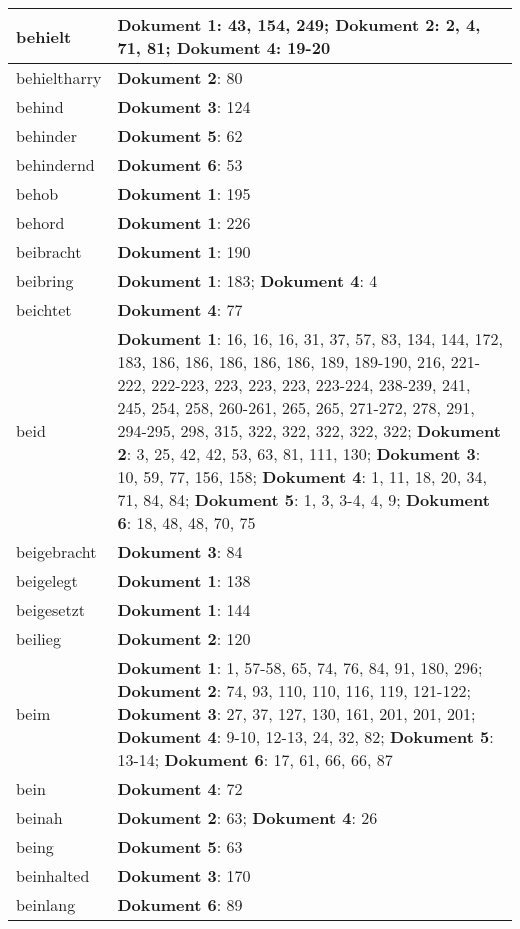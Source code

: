 \documentclass[a5paper]{article}
\begin{document}
\begin{longtable}[l]{|l|p{3in}|}
\hline
behielt & \textbf{Dokument 1}: 43, 154, 249; \textbf{Dokument 2}: 2, 4, 71, 81; \textbf{Dokument 4}: 19-20 \\
\hline
behieltharry & \textbf{Dokument 2}: 80 \\
\hline
behind & \textbf{Dokument 3}: 124 \\
\hline
behinder & \textbf{Dokument 5}: 62 \\
\hline
behindernd & \textbf{Dokument 6}: 53 \\
\hline
behob & \textbf{Dokument 1}: 195 \\
\hline
behord & \textbf{Dokument 1}: 226 \\
\hline
beibracht & \textbf{Dokument 1}: 190 \\
\hline
beibring & \textbf{Dokument 1}: 183; \textbf{Dokument 4}: 4 \\
\hline
beichtet & \textbf{Dokument 4}: 77 \\
\hline
beid & \textbf{Dokument 1}: 16, 16, 16, 31, 37, 57, 83, 134, 144, 172, 183, 186, 186, 186, 186, 186, 189, 189-190, 216, 221-222, 222-223, 223, 223, 223, 223-224, 238-239, 241, 245, 254, 258, 260-261, 265, 265, 271-272, 278, 291, 294-295, 298, 315, 322, 322, 322, 322, 322; \textbf{Dokument 2}: 3, 25, 42, 42, 53, 63, 81, 111, 130; \textbf{Dokument 3}: 10, 59, 77, 156, 158; \textbf{Dokument 4}: 1, 11, 18, 20, 34, 71, 84, 84; \textbf{Dokument 5}: 1, 3, 3-4, 4, 9; \textbf{Dokument 6}: 18, 48, 48, 70, 75 \\
\hline
beigebracht & \textbf{Dokument 3}: 84 \\
\hline
beigelegt & \textbf{Dokument 1}: 138 \\
\hline
beigesetzt & \textbf{Dokument 1}: 144 \\
\hline
beilieg & \textbf{Dokument 2}: 120 \\
\hline
beim & \textbf{Dokument 1}: 1, 57-58, 65, 74, 76, 84, 91, 180, 296; \textbf{Dokument 2}: 74, 93, 110, 110, 116, 119, 121-122; \textbf{Dokument 3}: 27, 37, 127, 130, 161, 201, 201, 201; \textbf{Dokument 4}: 9-10, 12-13, 24, 32, 82; \textbf{Dokument 5}: 13-14; \textbf{Dokument 6}: 17, 61, 66, 66, 87 \\
\hline
bein & \textbf{Dokument 4}: 72 \\
\hline
beinah & \textbf{Dokument 2}: 63; \textbf{Dokument 4}: 26 \\
\hline
being & \textbf{Dokument 5}: 63 \\
\hline
beinhalted & \textbf{Dokument 3}: 170 \\
\hline
beinlang & \textbf{Dokument 6}: 89 \\

\end{longtable}
\end{document}

